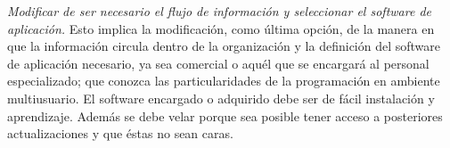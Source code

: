 \textit{Modificar de ser necesario el flujo de información y seleccionar el software de aplicación.} Esto implica la modificación, como última opción, de la manera en que la información circula dentro de la organización y la definición del software de aplicación necesario, ya sea comercial o aquél que se encargará al personal especializado; que conozca las particularidades de la programación en ambiente multiusuario. El software encargado o adquirido debe ser de fácil instalación y aprendizaje. Además se debe velar porque sea posible tener acceso a posteriores actualizaciones y que éstas no sean caras.
